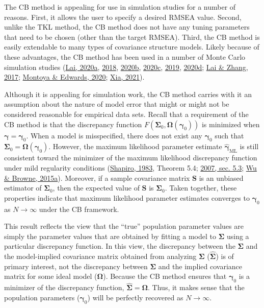 \documentclass[11pt]{umnthesis}
\begin{document}
The CB method is appealing for use in simulation studies for a number of reasons. First, it allows the user to specify a desired RMSEA value. Second, unlike the TKL method, the CB method does not have any tuning parameters that need to be chosen (other than the target RMSEA). Third, the CB method is easily extendable to many types of covariance structure models. Likely because of these advantages, the CB method has been used in a number of Monte Carlo simulation studies (\protect\hyperlink{ref-lai2020}{Lai, 2020a}, \protect\hyperlink{ref-lai2018}{2018}, \protect\hyperlink{ref-lai2020b}{2020b}, \protect\hyperlink{ref-lai2020c}{2020c}, \protect\hyperlink{ref-lai2019a}{2019}, \protect\hyperlink{ref-lai2020a}{2020d}; \protect\hyperlink{ref-lai2017}{Lai \& Zhang, 2017}; \protect\hyperlink{ref-montoya2020}{Montoya \& Edwards, 2020}; \protect\hyperlink{ref-xia2021}{Xia, 2021}).

Although it is appealing for simulation work, the CB method carries with it an assumption about the nature of model error that might or might not be considered reasonable for empirical data sets. Recall that a requirement of the CB method is that the discrepancy function \(F(\bm{\Sigma}_0, \bm{\Omega}(\bm{\gamma}_0))\) is minimized when \(\bm{\gamma} = \bm{\gamma}_0\). When a model is misspecified, there does not exist any \(\bm{\gamma}_0\) such that \(\bm{\Sigma}_0 = \bm{\Omega}(\bm{\gamma}_0)\). However, the maximum likelihood parameter estimate \(\hat{\bm{\gamma}}_{\textrm{ML}}\) is still consistent toward the minimizer of the maximum likelihood discrepancy function under mild regularity conditions (\protect\hyperlink{ref-shapiro1983}{Shapiro, 1983}, Theorem 5.4; \protect\hyperlink{ref-shapiro2007}{2007, sec. 5.3}; \protect\hyperlink{ref-wu2015}{Wu \& Browne, 2015a}). Moreover, if a sample covariance matrix \(\mathbf{S}\) is an unbiased estimator of \(\bm{\Sigma}_0\), then the expected value of \(\mathbf{S}\) is \(\bm{\Sigma}_0\). Taken together, these properties indicate that maximum likelihood parameter estimates converges to \(\bm{\gamma}_0\) as \(N \to \infty\) under the CB framework.

This result reflects the view that the ``true'' population parameter values are simply the parameter values that are obtained by fitting a model to \(\bm{\Sigma}\) using a particular discrepancy function. In this view, the discrepancy between the \(\bm{\Sigma}\) and the model-implied covariance matrix obtained from analyzing \(\bm{\Sigma}\) (\(\hat{\bm{\Sigma}}\)) is of primary interest, not the discrepancy between \(\bm{\Sigma}\) and the implied covariance matrix for some ideal model (\(\bm{\Omega}\)). Because the CB method ensures that \(\bm{\gamma}_0\) is a minimizer of the discrepancy function, \(\hat{\bm{\Sigma}} = \bm{\Omega}\). Thus, it makes sense that the population parameters (\(\bm{\gamma}_0\)) will be perfectly recovered as \(N \to \infty\).
\end{document}
